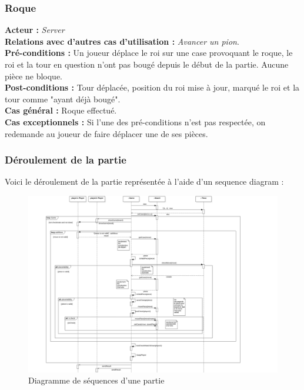 \documentclass[10pt, a4paper]{article}
\begin{document}
\subsubsection{Roque}
\textbf{Acteur :} \textit{Server} \\
\textbf{Relations avec d'autres cas d'utilisation :} {\itshape Avancer un pion}. \\
\textbf{Pré-conditions :} Un joueur déplace le roi sur une case provoquant le roque, le roi et la tour en question n'ont pas bougé depuis le début de la partie. Aucune pièce ne bloque. \\
\textbf{Post-conditions :} Tour déplacée, position du roi mise à jour, marqué le roi et la tour comme "ayant déjà bougé". \\
\textbf{Cas général :} Roque effectué. \\
\textbf{Cas exceptionnels :} Si l'une des pré-conditions n'est pas respectée, on redemande au joueur de faire déplacer une de ses pièces. \\

\subsubsection{Déroulement de la partie}
Voici le déroulement de la partie représentée à l'aide d'un sequence diagram : \\

\begin{figure}[ht]
\includegraphics[scale=0.53]{SequenceDiagramClassicChessTurn.png}
\caption{Diagramme de séquences d'une partie}
\label{SD_classicgame}
\end{figure}
\clearpage
\end{document}
